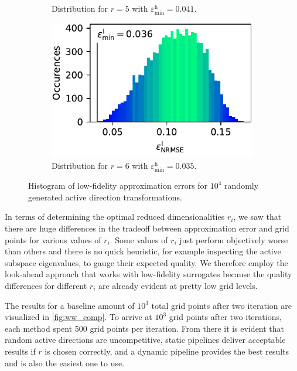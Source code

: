 \documentclass[
  a4paper,  %
  twoside,  %
  bibliography=totoc,
  headsepline,
  cleardoublepage=empty,
  parskip=half,
  draft=false
]{scrbook}
\begin{document}
\begin{mdframed}[style=style]
\begin{figure}[H]
\begin{subfigure}{.5\textwidth}
  \caption{Distribution for $r=5$ with $\varepsilon^\mathrm{h}_{\mathrm{min}}=0.041$.}
\vspace{3mm}
\label{fig:ww_hist_5}
\end{subfigure}%
\begin{subfigure}{.5\textwidth}
  \centering
   \includegraphics[width=0.95\linewidth]{graphics/ww_hist_6}
  \caption{Distribution for $r=6$ with $\varepsilon^\mathrm{h}_{\mathrm{min}}=0.035$.}
\vspace{3mm}
\label{fig:ww_hist_6}
\end{subfigure}
\delimit
\caption{Histogram of low-fidelity approximation errors for $10^4$ randomly generated active direction transformations.}
\label{fig:ww_hist_all}
\end{figure}
\end{mdframed}
%
In terms of determining the optimal reduced dimensionalities $r_i$, we saw that there are huge differences in the tradeoff between approximation error and grid points for various values of $r_i$.
Some values of $r_i$ just perform objectively worse than others and there is no quick heuristic, for example inspecting the active subspace eigenvalues, to gauge their expected quality.
We therefore employ the look-ahead approach that works with low-fidelity surrogates because the quality differences for different $r_i$ are already evident at pretty low grid levels.

The results for a baseline amount of $10^3$ total grid points after two iteration are visualized in \cref{fig:ww_comp}.
To arrive at $10^3$ grid points after two iterations, each method spent 500 grid points per iteration.
From there it is evident that random active directions are uncompetitive, static pipelines deliver acceptable results if $r$ is chosen correctly, and a dynamic pipeline provides the best results and is also the easiest one to use.
\end{document}
